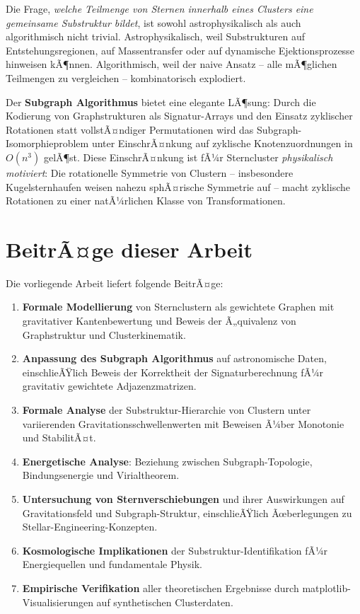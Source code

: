 ﻿\documentclass[a4paper,12pt]{report}
\theoremstyle{definition}
\begin{document}
Die Frage, \emph{welche Teilmenge von Sternen innerhalb eines Clusters eine gemeinsame Substruktur bildet}, ist sowohl astrophysikalisch als auch algorithmisch nicht trivial. Astrophysikalisch, weil Substrukturen auf Entstehungsregionen, auf Massentransfer oder auf dynamische Ejektionsprozesse hinweisen kÃ¶nnen. Algorithmisch, weil der naive Ansatz -- alle mÃ¶glichen Teilmengen zu vergleichen -- kombinatorisch explodiert.

Der \textbf{Subgraph Algorithmus} \cite{epp2026} bietet eine elegante LÃ¶sung: Durch die Kodierung von Graphstrukturen als Signatur-Arrays und den Einsatz zyklischer Rotationen statt vollstÃ¤ndiger Permutationen wird das Subgraph-Isomorphieproblem unter EinschrÃ¤nkung auf zyklische Knotenzuordnungen in $O(n^3)$ gelÃ¶st. Diese EinschrÃ¤nkung ist fÃ¼r Sterncluster \emph{physikalisch motiviert}: Die rotationelle Symmetrie von Clustern -- insbesondere Kugelsternhaufen weisen nahezu sphÃ¤rische Symmetrie auf -- macht zyklische Rotationen zu einer natÃ¼rlichen Klasse von Transformationen.

\section{BeitrÃ¤ge dieser Arbeit}

Die vorliegende Arbeit liefert folgende BeitrÃ¤ge:

\begin{enumerate}
    \item \textbf{Formale Modellierung} von Sternclustern als gewichtete Graphen mit gravitativer Kantenbewertung und Beweis der Ã„quivalenz von Graphstruktur und Clusterkinematik.
    \item \textbf{Anpassung des Subgraph Algorithmus} auf astronomische Daten, einschlieÃŸlich Beweis der Korrektheit der Signaturberechnung fÃ¼r gravitativ gewichtete Adjazenzmatrizen.
    \item \textbf{Formale Analyse} der Substruktur-Hierarchie von Clustern unter variierenden Gravitationsschwellenwerten mit Beweisen Ã¼ber Monotonie und StabilitÃ¤t.
    \item \textbf{Energetische Analyse}: Beziehung zwischen Subgraph-Topologie, Bindungsenergie und Virialtheorem.
    \item \textbf{Untersuchung von Sternverschiebungen} und ihrer Auswirkungen auf Gravitationsfeld und Subgraph-Struktur, einschlieÃŸlich Ãœberlegungen zu Stellar-Engineering-Konzepten.
    \item \textbf{Kosmologische Implikationen} der Substruktur-Identifikation fÃ¼r Energiequellen und fundamentale Physik.
    \item \textbf{Empirische Verifikation} aller theoretischen Ergebnisse durch matplotlib-Visuali\-sierungen auf synthetischen Clusterdaten.
\end{enumerate}
\end{document}
